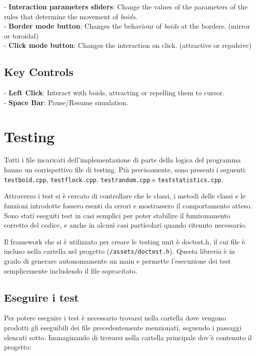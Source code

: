 \documentclass[10pt,a4paper]{article}
\begin{document}
- \textbf{Interaction parameters sliders}: Change the values of the parameters of the rules that determine the movement of \textit{boids}. \\
- \textbf{Border mode button}: Changes the behaviour of \textit{boids} at the borders. (mirror or toroidal) \\
- \textbf{Click mode button}: Changes the interaction on click. (attractive or repulsive)

\subsection{Key Controls}

- \textbf{Left Click}: Interact with boids, attracting or repelling them to cursor. \\
- \textbf{Space Bar}: Pause/Resume simulation.

\newpage

\section{Testing}

Tutti i file incaricati dell'implementazione di parte della logica del programma hanno un corrispettivo file di testing. Più precisamente, sono presenti i seguenti: \texttt{testboid.cpp}, \texttt{testflock.cpp}, \texttt{testrandom.cpp} e \texttt{teststatistics.cpp}. 

Attraverso i test si è cercato di controllare che le classi, i metodi delle classi e le funzioni introdotte fossero esenti da errori e mostrassero il comportamento atteso. Sono stati eseguiti test in casi semplici per poter stabilire il funzionamento corretto del codice, e anche in alcuni casi particolari quando ritenuto necessario.

Il framework che si è utilizzato per creare le testing unit è doctest.h, il cui file è incluso nella cartella nel progetto (\texttt{/assets/doctest.h}). Questa libreria è in grado di generare autonomamente un main e permette l'esecuzione dei test semplicemente includendo il file sopracitato.

\subsection{Eseguire i test}

Per potere eseguire i test è necessario trovarsi nella cartella dove vengono prodotti gli eseguibili dei file precedentemente menzionati, seguendo i passaggi elencati sotto. Immaginando di trovarsi nella cartella principale dov'è contenuto il progetto:
\end{document}
